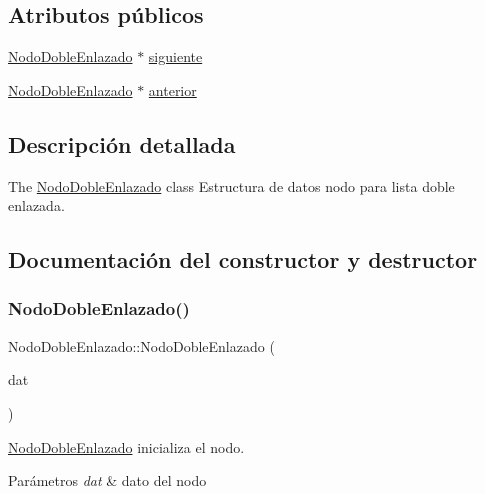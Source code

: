 \subsection*{Atributos públicos}
\begin{DoxyCompactItemize}
\item 
\mbox{\hyperlink{class_nodo_doble_enlazado}{Nodo\+Doble\+Enlazado}} $\ast$ \mbox{\hyperlink{class_nodo_doble_enlazado_a5e67691aee2e78dd7d89f7df80ca84da}{siguiente}}
\item 
\mbox{\hyperlink{class_nodo_doble_enlazado}{Nodo\+Doble\+Enlazado}} $\ast$ \mbox{\hyperlink{class_nodo_doble_enlazado_aec27165ad44ca05a20a4c80f93db9c96}{anterior}}
\end{DoxyCompactItemize}


\subsection{Descripción detallada}
The \mbox{\hyperlink{class_nodo_doble_enlazado}{Nodo\+Doble\+Enlazado}} class Estructura de datos nodo para lista doble enlazada. 

\subsection{Documentación del constructor y destructor}
\mbox{\label{class_nodo_doble_enlazado_af8def34f6a5d897ae96434eabfbadd1d}} 
\subsubsection{\texorpdfstring{Nodo\+Doble\+Enlazado()}{NodoDobleEnlazado()}}
{\footnotesize\ttfamily Nodo\+Doble\+Enlazado\+::\+Nodo\+Doble\+Enlazado (\begin{DoxyParamCaption}\item[{Q\+String}]{dat }\end{DoxyParamCaption})\hspace{0.3cm}{\ttfamily [inline]}}



\mbox{\hyperlink{class_nodo_doble_enlazado}{Nodo\+Doble\+Enlazado}} inicializa el nodo. 


\begin{DoxyParams}{Parámetros}
{\em dat} & dato del nodo \\
\hline
\end{DoxyParams}


